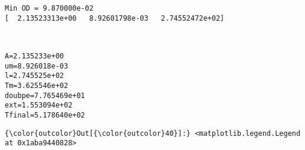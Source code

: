 \documentclass[11pt]{article}
\begin{document}
    \begin{Verbatim}[commandchars=\\\{\}]
Min OD = 9.870000e-02
[  2.13523313e+00   8.92601798e-03   2.74552472e+02]

    \end{Verbatim}

    \begin{center}
    \end{center}
    { \hspace*{\fill} \\}
    
    \begin{Verbatim}[commandchars=\\\{\}]
A=2.135233e+00
um=8.926018e-03
l=2.745525e+02
Tm=3.625546e+02
doubpe=7.765469e+01
ext=1.553094e+02
Tfinal=5.178640e+02

    \end{Verbatim}

            \begin{Verbatim}[commandchars=\\\{\}]
{\color{outcolor}Out[{\color{outcolor}40}]:} <matplotlib.legend.Legend at 0x1aba9440828>
\end{Verbatim}
        
    \begin{center}
    \end{center}
    { \hspace*{\fill} \\}
    
    \begin{center}
    \end{center}
    { \hspace*{\fill} \\}
    
\end{document}
